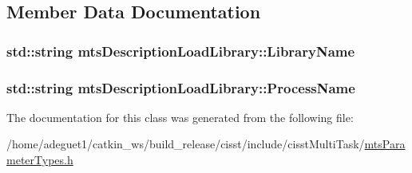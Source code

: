 \subsection{Member Data Documentation}
\hypertarget{classmts_description_load_library_aaefed2ef09ccb43bf153e813ab022167}{
\subsubsection[{Library\-Name}]{\setlength{\rightskip}{0pt plus 5cm}std\-::string mts\-Description\-Load\-Library\-::\-Library\-Name}}\label{classmts_description_load_library_aaefed2ef09ccb43bf153e813ab022167}
\hypertarget{classmts_description_load_library_a4632a3ec13b1887b43383d2ee1e4c18f}{
\subsubsection[{Process\-Name}]{\setlength{\rightskip}{0pt plus 5cm}std\-::string mts\-Description\-Load\-Library\-::\-Process\-Name}}\label{classmts_description_load_library_a4632a3ec13b1887b43383d2ee1e4c18f}


The documentation for this class was generated from the following file\-:\begin{DoxyCompactItemize}
\item 
/home/adeguet1/catkin\-\_\-ws/build\-\_\-release/cisst/include/cisst\-Multi\-Task/\hyperlink{mts_parameter_types_8h}{mts\-Parameter\-Types.\-h}\end{DoxyCompactItemize}
